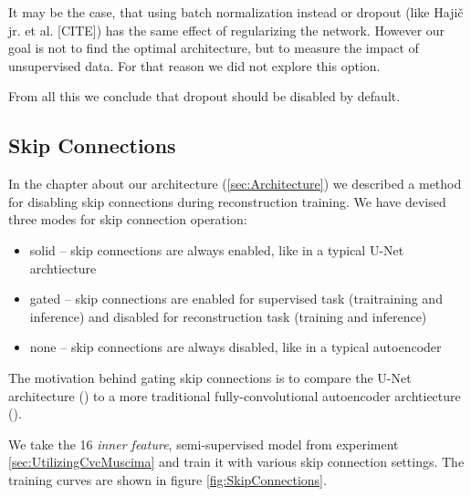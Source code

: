 It may be the case, that using batch normalization instead or dropout (like Hajič jr. et al. [CITE]) has the same effect of regularizing the network. However our goal is not to find the optimal architecture, but to measure the impact of unsupervised data. For that reason we did not explore this option.

From all this we conclude that dropout should be disabled by default.


\subsection{Skip Connections}
\label{sec:SkipConnections}

In the chapter about our architecture (\ref{sec:Architecture}) we described a method for disabling skip connections during reconstruction training. We have devised three modes for skip connection operation:

\begin{itemize}
    \item solid -- skip connections are always enabled, like in a typical U-Net archtiecture
    \item gated -- skip connections are enabled for supervised task (traitraining and inference) and disabled for reconstruction task (training and inference)
    \item none -- skip connections are always disabled, like in a typical autoencoder
\end{itemize}

The motivation behind gating skip connections is to compare the U-Net architecture (\cite{UNet}) to a more traditional fully-convolutional autoencoder archtiecture (\cite{AutoencodersOverview}).

We take the 16 \emph{inner feature}, semi-supervised model from experiment \ref{sec:UtilizingCvcMuscima} and train it with various skip connection settings. The training curves are shown in figure \ref{fig:SkipConnections}.

